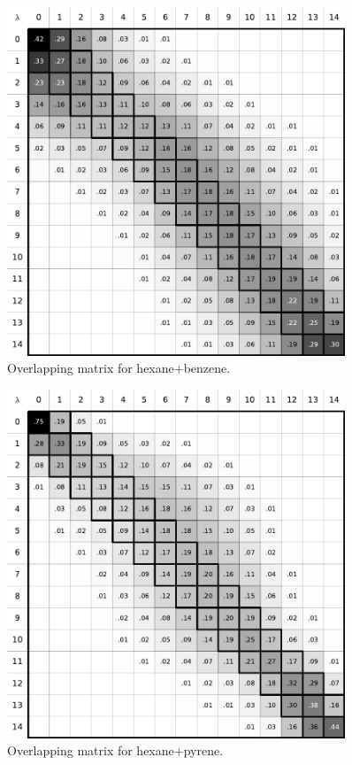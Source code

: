\documentclass[
	12pt,				%
	openright,			%
	oneside,			%
	a4paper,			%
	english,			%
	brazil				%
	]{abntex2}
\begin{document}
\begin{apendicesenv}
\begin{figure}[H]
	\centering
	\includegraphics[width=0.9\textwidth]{Figures/ohex_benz}
	\caption{Overlapping matrix for hexane+benzene.}
\end{figure}

\begin{figure}[H]
	\centering
	\includegraphics[width=0.9\textwidth]{Figures/ohex_pyr}
	\caption{Overlapping matrix for hexane+pyrene.}
\end{figure}


\end{apendicesenv}
\end{document}
